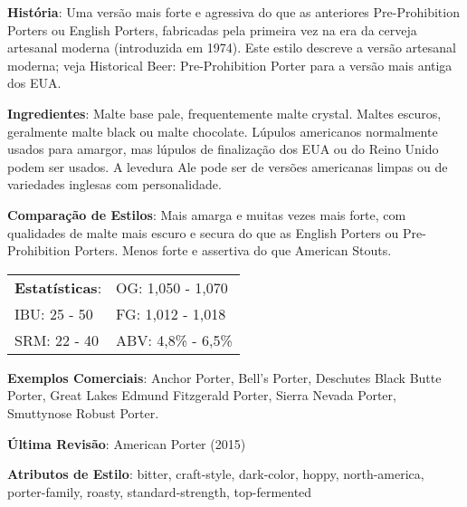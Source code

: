 \textbf{História}: Uma versão mais forte e agressiva do que as anteriores Pre-Prohibition Porters ou English Porters, fabricadas pela primeira vez na era da cerveja artesanal moderna (introduzida em 1974). Este estilo descreve a versão artesanal moderna; veja Historical Beer: Pre-Prohibition Porter para a versão mais antiga dos EUA.

\textbf{Ingredientes}: Malte base pale, frequentemente malte crystal. Maltes escuros, geralmente malte black ou malte chocolate. Lúpulos americanos normalmente usados para amargor, mas lúpulos de finalização dos EUA ou do Reino Unido podem ser usados. A levedura Ale pode ser de versões americanas limpas ou de variedades inglesas com personalidade.

\textbf{Comparação de Estilos}: Mais amarga e muitas vezes mais forte, com qualidades de malte mais escuro e secura do que as English Porters ou Pre-Prohibition Porters. Menos forte e assertiva do que American Stouts.

\begin{tabular}{@{}p{35mm}p{35mm}@{}}
  \textbf{Estatísticas}: & OG: 1,050 - 1,070 \\
  IBU: 25 - 50  & FG: 1,012 - 1,018 \\
  SRM: 22 - 40  & ABV: 4,8\% - 6,5\%
\end{tabular}

\textbf{Exemplos Comerciais}: Anchor Porter, Bell’s Porter, Deschutes Black Butte Porter, Great Lakes Edmund Fitzgerald Porter, Sierra Nevada Porter, Smuttynose Robust Porter.

\textbf{Última Revisão}: American Porter (2015)

\textbf{Atributos de Estilo}: bitter, craft-style, dark-color, hoppy, north-america, porter-family, roasty, standard-strength, top-fermented
